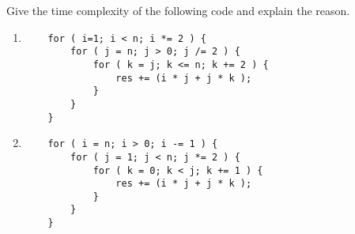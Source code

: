 \problem{}
Give the time complexity of the following code and explain the reason.
\begin{enumerate}[(1)]
	\item 
	
	\begin{lstlisting}
    for ( i=1; i < n; i *= 2 ) {
        for ( j = n; j > 0; j /= 2 ) {
            for ( k = j; k <= n; k += 2 ) {
                res += (i * j + j * k );
            }
        }
    }
    \end{lstlisting}
	
	\item 
	\begin{lstlisting}
    for ( i = n; i > 0; i -= 1 ) {
        for ( j = 1; j < n; j *= 2 ) {
            for ( k = 0; k < j; k += 1 ) {
                res += (i * j + j * k );
            }
        }
    }

\end{lstlisting}
\end{enumerate}

 
